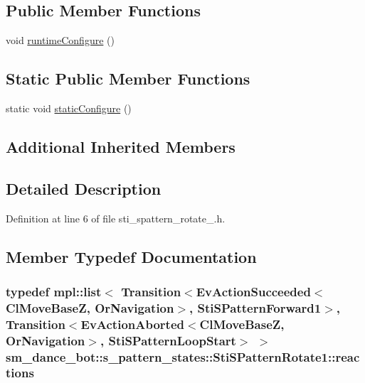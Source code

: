 \subsection*{Public Member Functions}
\begin{DoxyCompactItemize}
\item 
void \hyperlink{structsm__dance__bot_1_1s__pattern__states_1_1StiSPatternRotate1_a6ecc77b564e81e06b2c058f4edcaac10}{runtime\+Configure} ()
\end{DoxyCompactItemize}
\subsection*{Static Public Member Functions}
\begin{DoxyCompactItemize}
\item 
static void \hyperlink{structsm__dance__bot_1_1s__pattern__states_1_1StiSPatternRotate1_a22e28b6bd56041b42472185c5fd74ff7}{static\+Configure} ()
\end{DoxyCompactItemize}
\subsection*{Additional Inherited Members}


\subsection{Detailed Description}


Definition at line 6 of file sti\+\_\+spattern\+\_\+rotate\+\_.\+h.



\subsection{Member Typedef Documentation}
\subsubsection[{\texorpdfstring{reactions}{reactions}}]{\setlength{\rightskip}{0pt plus 5cm}typedef mpl\+::list$<$ Transition$<$Ev\+Action\+Succeeded$<${\bf Cl\+Move\+BaseZ}, {\bf Or\+Navigation}$>$, {\bf Sti\+S\+Pattern\+Forward1}$>$, Transition$<$Ev\+Action\+Aborted$<${\bf Cl\+Move\+BaseZ}, {\bf Or\+Navigation}$>$, {\bf Sti\+S\+Pattern\+Loop\+Start}$>$ $>$ {\bf sm\+\_\+dance\+\_\+bot\+::s\+\_\+pattern\+\_\+states\+::\+Sti\+S\+Pattern\+Rotate1\+::reactions}}\hypertarget{structsm__dance__bot_1_1s__pattern__states_1_1StiSPatternRotate1_a0d9e39c0154f6ae391fe6982e699ebdd}{}\label{structsm__dance__bot_1_1s__pattern__states_1_1StiSPatternRotate1_a0d9e39c0154f6ae391fe6982e699ebdd}


